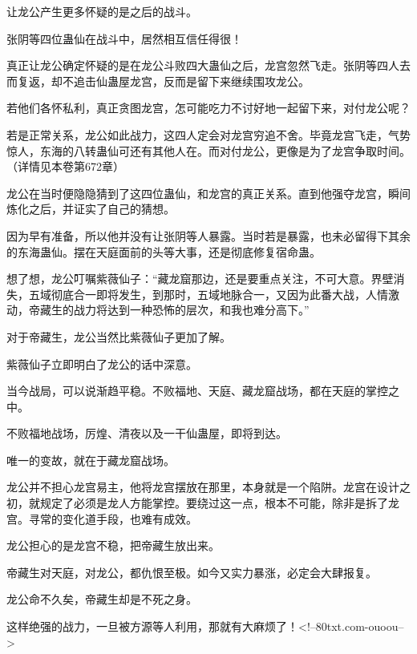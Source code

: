 \begin{this_body}
让龙公产生更多怀疑的是之后的战斗。

张阴等四位蛊仙在战斗中，居然相互信任得很！

真正让龙公确定怀疑的是在龙公斗败四大蛊仙之后，龙宫忽然飞走。张阴等四人去而复返，却不追击仙蛊屋龙宫，反而是留下来继续围攻龙公。

若他们各怀私利，真正贪图龙宫，怎可能吃力不讨好地一起留下来，对付龙公呢？

若是正常关系，龙公如此战力，这四人定会对龙宫穷追不舍。毕竟龙宫飞走，气势惊人，东海的八转蛊仙可还有其他人在。而对付龙公，更像是为了龙宫争取时间。（详情见本卷第672章）

龙公在当时便隐隐猜到了这四位蛊仙，和龙宫的真正关系。直到他强夺龙宫，瞬间炼化之后，并证实了自己的猜想。

因为早有准备，所以他并没有让张阴等人暴露。当时若是暴露，也未必留得下其余的东海蛊仙。摆在天庭面前的头等大事，还是彻底修复宿命蛊。

想了想，龙公叮嘱紫薇仙子：“藏龙窟那边，还是要重点关注，不可大意。界壁消失，五域彻底合一即将发生，到那时，五域地脉合一，又因为此番大战，人情激动，帝藏生的战力将达到一种恐怖的层次，和我也难分高下。”

对于帝藏生，龙公当然比紫薇仙子更加了解。

紫薇仙子立即明白了龙公的话中深意。

当今战局，可以说渐趋平稳。不败福地、天庭、藏龙窟战场，都在天庭的掌控之中。

不败福地战场，厉煌、清夜以及一干仙蛊屋，即将到达。

唯一的变故，就在于藏龙窟战场。

龙公并不担心龙宫易主，他将龙宫摆放在那里，本身就是一个陷阱。龙宫在设计之初，就规定了必须是龙人方能掌控。要绕过这一点，根本不可能，除非是拆了龙宫。寻常的变化道手段，也难有成效。

龙公担心的是龙宫不稳，把帝藏生放出来。

帝藏生对天庭，对龙公，都仇恨至极。如今又实力暴涨，必定会大肆报复。

龙公命不久矣，帝藏生却是不死之身。

这样绝强的战力，一旦被方源等人利用，那就有大麻烦了！<!--80txt.com-ouoou-->

\end{this_body}

